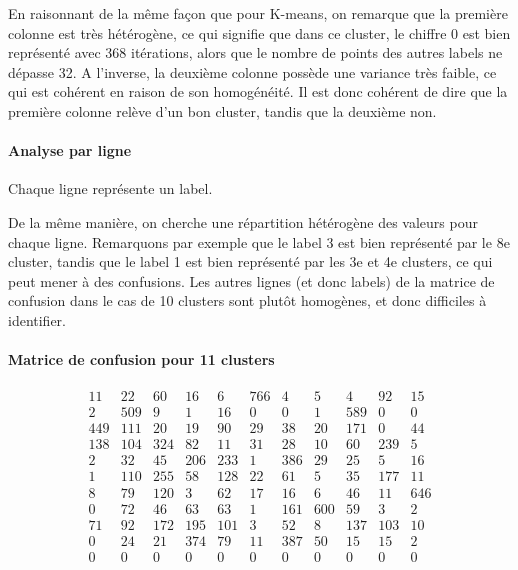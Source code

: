 \documentclass[french,a4paper,18pt]{article}
\begin{document}
En raisonnant de la même façon que pour K-means, on remarque que la première colonne est très hétérogène, 
ce qui signifie que dans ce cluster, le chiffre 0 est bien représenté avec 368 itérations, alors que le nombre 
de points des autres labels ne dépasse 32.
A l'inverse, la deuxième colonne possède une variance très faible, ce qui est cohérent en raison de son homogénéité.
Il est donc cohérent de dire que la première colonne relève d'un bon cluster, tandis que la deuxième non.

\paragraph{Analyse par ligne}
Chaque ligne représente un label.

De la même manière, on cherche une répartition hétérogène des valeurs pour chaque ligne.
Remarquons par exemple que le label 3 est bien représenté par le 8e cluster, tandis que le label 1 est bien représenté par les 3e et 4e clusters, 
ce qui peut mener à des confusions.
Les autres lignes (et donc labels) de la matrice de confusion dans le cas de 10 clusters sont plutôt homogènes, et donc difficiles à identifier.


\paragraph{Matrice de confusion pour 11 clusters}

\[
\begin{smallmatrix}
11 & 22 & 60 & 16 & 6 & 766 & 4 & 5 & 4 & 92 & 15 \\
2 & 509 & 9 & 1 & 16 & 0 & 0 & 1 & 589 & 0 & 0 \\
449 & 111 & 20 & 19 & 90 & 29 & 38 & 20 & 171 & 0 & 44 \\
138 & 104 & 324 & 82 & 11 & 31 & 28 & 10 & 60 & 239 & 5 \\
2 & 32 & 45 & 206 & 233 & 1 & 386 & 29 & 25 & 5 & 16 \\
1 & 110 & 255 & 58 & 128 & 22 & 61 & 5 & 35 & 177 & 11 \\
8 & 79 & 120 & 3 & 62 & 17 & 16 & 6 & 46 & 11 & 646 \\
0 & 72 & 46 & 63 & 63 & 1 & 161 & 600 & 59 & 3 & 2 \\
71 & 92 & 172 & 195 & 101 & 3 & 52 & 8 & 137 & 103 & 10 \\
0 & 24 & 21 & 374 & 79 & 11 & 387 & 50 & 15 & 15 & 2 \\
0 & 0 & 0 & 0 & 0 & 0 & 0 & 0 & 0 & 0 & 0 \\
\end{smallmatrix}
\]
\end{document}
